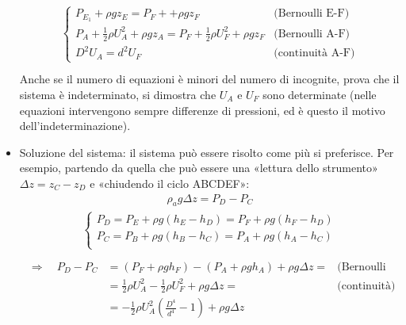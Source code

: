 \documentclass[letterpaper,10pt,italian]{jupyterBook}
\begin{document}
\begin{itemize}
\begin{align*}
\begin{aligned}
\begin{cases}
     P_{E_1} + \rho g z_{E} = P_F +  + \rho g z_F & \text{(Bernoulli E-F)} \\
     P_A + \frac{1}{2} \rho U_A^2 + \rho g z_A = P_F + \frac{1}{2}\rho U_F^2 + \rho g z_F & \text{(Bernoulli A-F)} \\
     D^2 U_A = d^2 U_F & \text{(continuità A-F)}
    \end{cases}\\
\end{aligned}\end{align*}
\sphinxAtStartPar
Anche se il numero di equazioni è minori del numero di incognite,
prova che il sistema è indeterminato, si dimostra che \(U_A\) e \(U_F\)
sono determinate (nelle equazioni intervengono sempre differenze di
pressioni, ed è questo il motivo dell’indeterminazione).

\item {} 
\sphinxAtStartPar
Soluzione del sistema: il sistema può essere risolto come più si
preferisce. Per esempio, partendo da quella che può essere una
«lettura dello strumento» \(\Delta z = z_C - z_D\) e «chiudendo il
ciclo ABCDEF»:
\begin{equation*}
\begin{split}\rho_a g \Delta z = P_D - P_C\end{split}
\end{equation*}\begin{equation*}
\begin{split}\begin{cases}
        P_D = P_E + \rho g (h_E - h_D) = P_F + \rho g (h_F - h_D)\\
        P_C = P_B + \rho g (h_B - h_C) = P_A + \rho g (h_A - h_C)\\
      \end{cases} \\\end{split}
\end{equation*}\begin{equation*}
\begin{split}\begin{aligned}
      \Rightarrow \quad P_D - P_C & = (P_F + \rho g h_F) - (P_A + \rho g h_A) + \rho g \Delta z = 
      & \text{(Bernoulli A-F)}\\
       & = \frac{1}{2}\rho U_A^2 - \frac{1}{2}\rho U_F^2 + \rho g \Delta z = 
      & \text{(continuità)}\\
       & = -\frac{1}{2}\rho U_A^2 \displaystyle\left( \frac{D^4}{d^4} - 1 \right) + \rho g \Delta z \\
    \end{aligned}\end{split}

\end{equation*}
\end{itemize}
\end{document}
